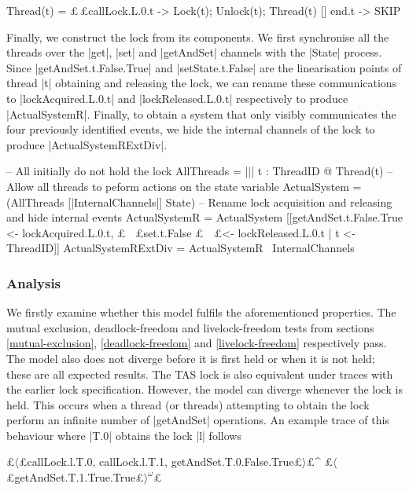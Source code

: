 \begin{cspm}
  Thread(t) =   £$\,$£callLock.L.0.t -> Lock(t); Unlock(t); Thread(t)
              [] end.t -> SKIP
\end{cspm}

Finally, we construct the lock from its components. We first synchronise all the threads over the |get|, |set| and |getAndSet| channels with the |State| process. Since |getAndSet.t.False.True| and |setState.t.False| are the linearisation points of thread |t| obtaining and releasing the lock, we can rename these communications to |lockAcquired.L.0.t| and |lockReleased.L.0.t| respectively to produce |ActualSystemR|. Finally, to obtain a system that only visibly communicates the four previously identified events, we hide the internal channels of the lock to produce |ActualSystemRExtDiv|.


\begin{cspm}
  -- All initially do not hold the lock
  AllThreads = ||| t : ThreadID @ Thread(t)
  -- Allow all threads to peform actions on the state variable
  ActualSystem = (AllThreads [|InternalChannels|] State)
  -- Rename lock acquisition and releasing and hide internal events
  ActualSystemR = ActualSystem 
                    [[getAndSet.t.False.True <- lockAcquired.L.0.t, 
                     £$\!\!\:\:\!\!\:\!\:$£set.t.False            £$\!\!\:\:\!\!\:\!\;$£<- lockReleased.L.0.t  | t <- ThreadID]]
  ActualSystemRExtDiv = ActualSystemR \ InternalChannels
\end{cspm}

\subsubsection{Analysis}

We firstly examine whether this model fulfils the aforementioned properties. The mutual exclusion, deadlock-freedom and livelock-freedom tests from sections \ref{mutual-exclusion}, \ref{deadlock-freedom} and \ref{livelock-freedom} respectively pass. The model also does not diverge before it is first held or when it is not held; these are all expected results. The TAS lock is also equivalent under traces with the earlier lock specification. However, the model can diverge whenever the lock is held. This occurs when a thread (or threads) attempting to obtain the lock perform an infinite number of |getAndSet| operations. An example trace of this behaviour where |T.0| obtains the lock |l| follows
\begin{cspm}
  £$\langle$£callLock.l.T.0, callLock.l.T.1, getAndSet.T.0.False.True£$\rangle$£^
    £$\langle$£getAndSet.T.1.True.True£$\rangle^\omega$£
\end{cspm}
  
